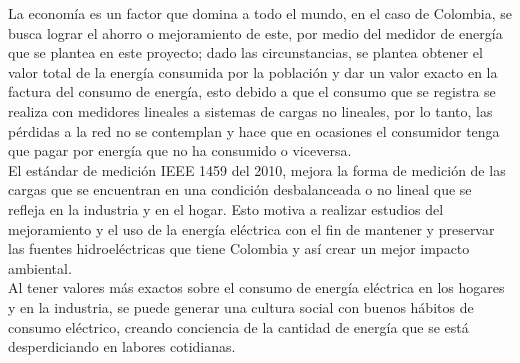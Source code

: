 La economía es un factor que domina a todo el mundo, en el caso de Colombia, se busca lograr el ahorro o mejoramiento de este, por medio del medidor de energía que se plantea en este proyecto; dado las circunstancias, se plantea obtener el valor total de la energía consumida por la población y dar un valor exacto en la factura del consumo de energía, esto debido a que el consumo que se registra se realiza con medidores lineales a sistemas de cargas no lineales, por lo tanto, las pérdidas a la red no se contemplan y hace que en ocasiones el consumidor tenga que pagar por energía que no ha consumido o viceversa.\\

El estándar de medición IEEE 1459 del 2010, mejora la forma de medición de las cargas que se encuentran en una condición desbalanceada o no lineal que se refleja en la industria y en el hogar. Esto motiva a realizar estudios del mejoramiento y el uso de la energía eléctrica con el fin de mantener y preservar las fuentes hidroeléctricas que tiene Colombia y así crear un mejor impacto ambiental.\\

Al tener valores más exactos sobre el consumo de energía eléctrica en los hogares y en la industria, se puede generar una cultura social con buenos hábitos de consumo eléctrico, creando conciencia de la cantidad de energía que se está desperdiciando en labores cotidianas.\\

